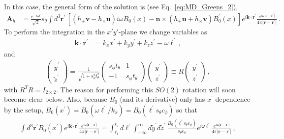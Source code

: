 \documentclass[a4paper,11pt]{article}
\begin{document}
In this case, the general form of the solution is (see Eq.~\eqref{eq:MD_Greens_2}),
%
\begin{align}
     \bm{A}_{h}
     & =  \frac{e^{- i \omega t}}{ \sqrt{2}  }  s_{\theta}    \int d^{3} \bm{r}^{\prime}   \, \left[ 
 \left(  h_{+} \bm{v} - h_{\times} \bm{u}  \right) i \omega B_{0}(x)  - \bm{n} \times (h_{+} \bm{u} + h_{\times} \bm{v} )  B_{0}^{\prime}(x) \right]  e^{i \bm{k} \cdot \bm{r}^{\prime} }  \frac{e^{i \omega \vert \bm{r} - \bm{r}^{\prime} \vert} }{ 4 \pi \vert \bm{r} - \bm{r}^{\prime} \vert }  \,.
\end{align}
%
To perform the integration in the $x'y'$-plane we change variables as
%
\begin{align}
    \bm{k} \cdot \bm{r}^{\prime} & = k_{x}x^{\prime} + k_{y} y^{\prime} + k_{z}z^{\prime} \equiv \omega \ell^{\prime}  \,,
\end{align}
%
and
%
\begin{align}
    \begin{pmatrix}
        \tilde{y}^{\prime} \\
        \tilde{z}^{\prime} 
    \end{pmatrix}
    = \frac{1}{\sqrt{1 + s_{\phi}^{2} t_{\theta}^{2}}} \begin{pmatrix}
       s_{\phi} t_{\theta} &  1  \\
        - 1  &  s_{\phi} t_{\theta}
    \end{pmatrix} 
    \begin{pmatrix}
        y^{\prime} \\ z^{\prime}
    \end{pmatrix} \equiv R  \begin{pmatrix}
        y^{\prime} \\ z^{\prime}
    \end{pmatrix}\,,
\end{align}
%
with $ R^{T} R = I_{2\times2} $.
%
The reason for performing this $SO(2)$ rotation will soon become clear below.
%
Also, because $B_{0}$ (and its derivative) only has $ x^{\prime} $ dependence by the setup, $ B_{0}(x^{\prime}) = B_{0} (\omega \ell^{\prime}/k_{x} ) =B_{0} ( \ell^{\prime} s_{\theta} c_{\phi} )  $ so that
%
\begin{align}
     \int d^{3} \bm{r}^{\prime}   B_{0}  (x^{\prime}) e^{i \bm{k} \cdot \bm{r}^{\prime} }  \frac{e^{i \omega \vert \bm{r} - \bm{r}^{\prime} \vert} }{ 4 \pi \vert \bm{r} - \bm{r}^{\prime} \vert }  
     = \int_{\ell_{1}}^{\ell_{2}}  d\ell^{\prime}  \int_{-\infty}^{\infty} d\tilde{y}^{\prime} d\tilde{z}^{\prime} ~\frac{ B_{0}(\ell^{\prime} s_{\theta} c_{\phi}) }{s_{\theta} c_{\phi}} e^{i \omega \ell^{\prime}} \frac{e^{i \omega \vert \bm{r} - \bm{r}^{\prime} \vert} }{ 4 \pi \vert \bm{r} - \bm{r}^{\prime} \vert } \,,
\end{align}
\end{document}

